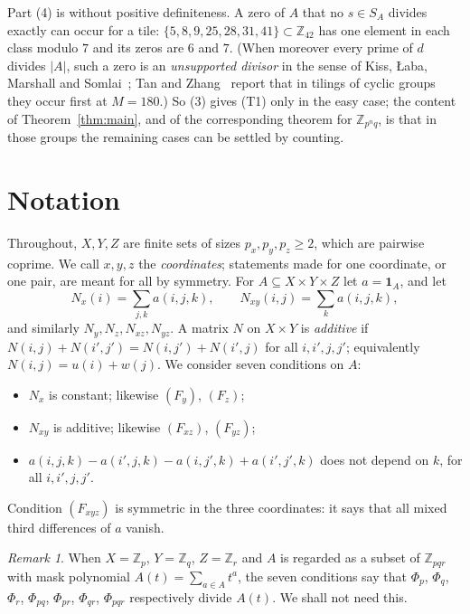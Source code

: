 \documentclass[11pt,a4paper]{amsart}
\theoremstyle{definition}
\theoremstyle{remark}
\newtheorem{remark}[theorem]{Remark}
\newcommand{\Z}{\mathbb{Z}}
\newcommand{\one}{\mathbf{1}}
\begin{document}
Part (4) is \cite[Prop.~4.1]{KLMS} without positive definiteness. A zero of $A$ that no $s\in S_A$ divides
exactly can occur for a tile: $\{5,8,9,25,28,31,41\}\subset\Z_{42}$ has one element in each class modulo $7$ and
its zeros are $6$ and $7$. (When moreover every prime of $d$ divides $|A|$, such a zero is an \emph{unsupported
divisor} in the sense of Kiss, {\L}aba, Marshall and Somlai~\cite[Definition~1.5]{KLaMS}; Tan and
Zhang~\cite{TZ} report that in tilings of cyclic groups they occur first at $M=180$.) So
(3) gives (T1) only in the easy case; the content of Theorem~\ref{thm:main}, and of the corresponding theorem for
$\Z_{p^nq}$, is that in those groups the remaining cases can be settled by counting.

\section{Notation}\label{sec:notation}

Throughout, $X,Y,Z$ are finite sets of sizes $p_x,p_y,p_z\ge 2$, which are pairwise coprime. We call $x,y,z$ the
\emph{coordinates}; statements made for one coordinate, or one pair, are meant for all by symmetry. For
$A\subseteq X\times Y\times Z$ let $a=\one_A$, and let
\[
 N_x(i)=\sum_{j,k}a(i,j,k),\qquad N_{xy}(i,j)=\sum_k a(i,j,k),
\]
and similarly $N_y,N_z,N_{xz},N_{yz}$. A matrix $N$ on $X\times Y$ is \emph{additive} if
$N(i,j)+N(i',j')=N(i,j')+N(i',j)$ for all $i,i',j,j'$; equivalently $N(i,j)=u(i)+w(j)$. We consider seven
conditions on $A$:
\begin{itemize}
\item[$(F_x)$] $N_x$ is constant; likewise $(F_y)$, $(F_z)$;
\item[$(F_{xy})$] $N_{xy}$ is additive; likewise $(F_{xz})$, $(F_{yz})$;
\item[$(F_{xyz})$] $a(i,j,k)-a(i',j,k)-a(i,j',k)+a(i',j',k)$ does not depend on $k$, for all $i,i',j,j'$.
\end{itemize}
Condition $(F_{xyz})$ is symmetric in the three coordinates: it says that all mixed third differences of $a$ vanish.

\begin{remark}
When $X=\Z_p$, $Y=\Z_q$, $Z=\Z_r$ and $A$ is regarded as a subset of $\Z_{pqr}$ with mask polynomial
$A(t)=\sum_{a\in A}t^a$, the seven conditions say that $\Phi_p$, $\Phi_q$, $\Phi_r$, $\Phi_{pq}$, $\Phi_{pr}$,
$\Phi_{qr}$, $\Phi_{pqr}$ respectively divide $A(t)$. We shall not need this.
\end{remark}
\end{document}

